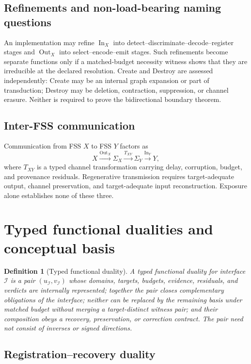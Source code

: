 \documentclass[11pt]{article}
\newtheorem{definition}{Definition}
\newcommand{\Sig}{\Sigma}
\newcommand{\InOp}{\operatorname{In}}
\newcommand{\OutOp}{\operatorname{Out}}
\begin{document}
\subsection{Refinements and non-load-bearing naming questions}

An implementation may refine $\InOp_X$ into detect--discriminate--decode--register stages and $\OutOp_X$ into select--encode--emit stages. Such refinements become separate functions only if a matched-budget necessity witness shows that they are irreducible at the declared resolution. Create and Destroy are assessed independently: Create may be an internal graph expansion or part of transduction; Destroy may be deletion, contraction, suppression, or channel erasure. Neither is required to prove the bidirectional boundary theorem.

\subsection{Inter-FSS communication}

Communication from FSS $X$ to FSS $Y$ factors as
\begin{equation}
X\xrightarrow{\OutOp_X}\Sig_X\xrightarrow{T_{XY}}\Sig_Y\xrightarrow{\InOp_Y}Y,
\end{equation}
where $T_{XY}$ is a typed channel transformation carrying delay, corruption, budget, and provenance residuals. Regenerative transmission requires target-adequate output, channel preservation, and target-adequate input reconstruction. Exposure alone establishes none of these three.

\section{Typed functional dualities and conceptual basis}

\begin{definition}[Typed functional duality]
A typed functional duality for interface $\mathcal I$ is a pair $(u_{\mathcal I},v_{\mathcal I})$ whose domains, targets, budgets, evidence, residuals, and verdicts are internally represented; together the pair closes complementary obligations of the interface; neither can be replaced by the remaining basis under matched budget without merging a target-distinct witness pair; and their composition obeys a recovery, preservation, or correction contract. The pair need not consist of inverses or signed directions.
\end{definition}

\subsection{Registration--recovery duality}
\end{document}

